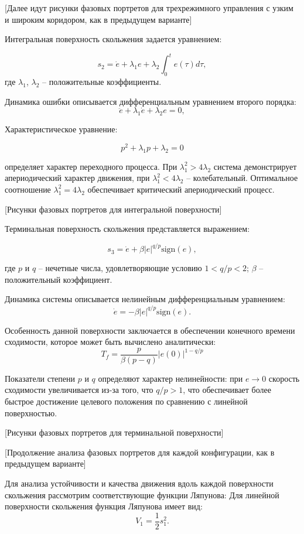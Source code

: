 [Далее идут рисунки фазовых портретов для трехрежимного управления с узким и широким коридором, как в предыдущем варианте]

Интегральная поверхность скольжения задается уравнением:

$$
s_2 = \dot{e} + \lambda_1 e + \lambda_2 \int_0^t e(\tau)d\tau,
$$
где $\lambda_1$, $\lambda_2$ -- положительные коэффициенты.

Динамика ошибки описывается дифференциальным уравнением второго порядка:
$$
\ddot{e} + \lambda_1 \dot{e} + \lambda_2 e = 0,
$$

Характеристическое уравнение:

$$
p^2 + \lambda_1 p + \lambda_2 = 0
$$

определяет характер переходного процесса. При $\lambda_1^2 > 4\lambda_2$ система демонстрирует
апериодический характер движения, при $\lambda_1^2 < 4\lambda_2$ -- колебательный.
Оптимальное соотношение $\lambda_1^2 = 4\lambda_2$ обеспечивает критический апериодический процесс.

[Рисунки фазовых портретов для интегральной поверхности]

Терминальная поверхность скольжения представляется выражением:

$$
s_3 = \dot{e} + \beta |e|^{q/p} \text{sign}(e),
$$

где $p$ и $q$ -- нечетные числа, удовлетворяющие условию $1 < q/p < 2$;
$\beta$ -- положительный коэффициент.

Динамика системы описывается нелинейным дифференциальным уравнением:
$$
\dot{e} = -\beta |e|^{q/p} \text{sign}(e).
$$

Особенность данной поверхности заключается в обеспечении конечного
времени сходимости, которое может быть вычислено аналитически:
$$
T_f = \frac{p}{\beta(p-q)}|e(0)|^{1-q/p}
$$

Показатели степени $p$ и $q$ определяют характер
нелинейности: при $e \to 0$ скорость сходимости
увеличивается из-за того, что $q/p > 1$, что обеспечивает более быстрое достижение
целевого положения по сравнению с линейной поверхностью.

[Рисунки фазовых портретов для терминальной поверхности]

[Продолжение анализа фазовых портретов для каждой конфигурации, как в предыдущем варианте]

Для анализа устойчивости и качества движения вдоль каждой поверхности
скольжения рассмотрим соответствующие функции Ляпунова:
Для линейной поверхности скольжения функция Ляпунова имеет вид:
$$
V_1 = \frac{1}{2}s_1^2.
$$

